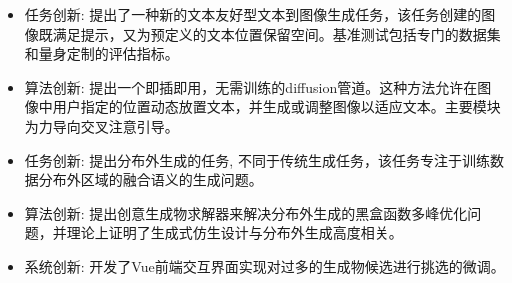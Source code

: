 \documentclass[UTF8,AutoFakeBold]{resume}
\begin{document}
    \begin{itemize}
    \item[\faThumbTack] \kaishu 任务创新: 提出了一种新的文本友好型文本到图像生成任务，该任务创建的图像既满足提示，又为预定义的文本位置保留空间。基准测试包括专门的数据集和量身定制的评估指标。
        \item[\faThumbTack] \kaishu 算法创新: 提出一个即插即用，无需训练的diffusion管道。这种方法允许在图像中用户指定的位置动态放置文本，并生成或调整图像以适应文本。主要模块为力导向交叉注意引导。
    \end{itemize}
    \begin{itemize}
    \item[\faThumbTack] \kaishu 任务创新: 提出分布外生成的任务, 不同于传统生成任务，该任务专注于训练数据分布外区域的融合语义的生成问题。
    \item[\faThumbTack] \kaishu 算法创新: 提出创意生成物求解器来解决分布外生成的黑盒函数多峰优化问题，并理论上证明了生成式仿生设计与分布外生成高度相关。
    \item[\faThumbTack] \kaishu 系统创新: 开发了Vue前端交互界面实现对过多的生成物候选进行挑选的微调。
    \end{itemize}
\end{document}
